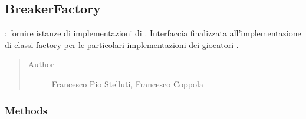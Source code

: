 \documentclass[letterpaper,10pt,italian,openany,oneside]{sphinxmanual}
\begin{document}
\begin{fulllineitems}
\label{\detokenize{test/it/unicam/cs/pa/mastermind/factories/BadRegistryException:it.unicam.cs.pa.mastermind.factories.BadRegistryException.BadRegistryException(String)}}
\end{fulllineitems}



\subsection{BreakerFactory}
\label{\detokenize{test/it/unicam/cs/pa/mastermind/factories/BreakerFactory:breakerfactory}}\label{\detokenize{test/it/unicam/cs/pa/mastermind/factories/BreakerFactory::doc}}

\begin{fulllineitems}
\label{\detokenize{test/it/unicam/cs/pa/mastermind/factories/BreakerFactory:it.unicam.cs.pa.mastermind.factories.BreakerFactory}}
: fornire istanze di implementazioni di . Interfaccia finalizzata all’implementazione di classi factory per le particolari implementazioni dei giocatori .
\begin{quote}\begin{description}
\item[{Author}] \leavevmode
Francesco Pio Stelluti, Francesco Coppola

\end{description}\end{quote}

\end{fulllineitems}



\subsubsection{Methods}
\label{\detokenize{test/it/unicam/cs/pa/mastermind/factories/BreakerFactory:methods}}
\end{document}
